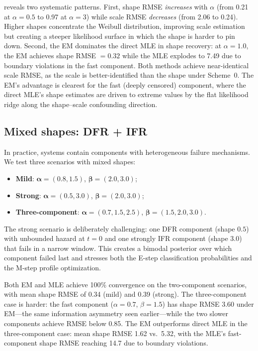 \documentclass[12pt]{article}
\theoremstyle{definition}
\theoremstyle{remark}
\newcommand{\balpha}{\boldsymbol{\alpha}}
\newcommand{\bbeta}{\boldsymbol{\beta}}
\begin{document}
 reveals two systematic patterns.
First, shape RMSE \emph{increases} with $\alpha$ (from 0.21 at
$\alpha = 0.5$ to 0.97 at $\alpha = 3$) while scale RMSE
\emph{decreases} (from 2.06 to 0.24).  Higher shapes concentrate
the Weibull distribution, improving scale estimation but creating
a steeper likelihood surface in which the shape is harder to pin
down.  Second, the EM dominates the direct MLE in shape recovery:
at $\alpha = 1.0$, the EM achieves shape RMSE $= 0.32$ while the
MLE explodes to 7.49 due to boundary violations in the fast
component.  Both methods achieve near-identical scale RMSE, as the
scale is better-identified than the shape under Scheme~0.  The EM's
advantage is clearest for the fast (deeply censored) component,
where the direct MLE's shape estimates are driven to extreme values
by the flat likelihood ridge along the shape--scale confounding
direction.

\subsection{Mixed shapes: DFR + IFR}
\label{sec:em-mixed}

In practice, systems contain components with heterogeneous
failure mechanisms.  We test three scenarios with mixed shapes:
\begin{itemize}
\item \textbf{Mild}: $\balpha = (0.8, 1.5)$,
  $\bbeta = (2.0, 3.0)$;
\item \textbf{Strong}: $\balpha = (0.5, 3.0)$,
  $\bbeta = (2.0, 3.0)$;
\item \textbf{Three-component}: $\balpha = (0.7, 1.5, 2.5)$,
  $\bbeta = (1.5, 2.0, 3.0)$.
\end{itemize}

The strong scenario is deliberately challenging: one DFR
component (shape $0.5$) with unbounded hazard at $t = 0$ and
one strongly IFR component (shape $3.0$) that fails in a narrow
window.  This creates a bimodal posterior over which component
failed last and stresses both the E-step classification
probabilities and the M-step profile optimization.

Both EM and MLE achieve 100\% convergence on the two-component
scenarios, with mean shape RMSE of 0.34 (mild) and 0.39
(strong).  The three-component case is harder: the fast
component ($\alpha = 0.7$, $\beta = 1.5$) has shape RMSE 3.60
under EM---the same information asymmetry seen earlier---while
the two slower components achieve RMSE below 0.85.  The EM
outperforms direct MLE in the three-component case: mean shape
RMSE 1.62 vs.\ 5.32, with the MLE's fast-component shape RMSE
reaching 14.7 due to boundary violations.
\end{document}
